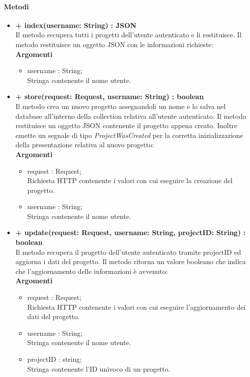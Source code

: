 	\paragraph{Metodi}
		\begin{itemize}
			\item \textbf{+ index(username: String) : JSON}\\
			Il metodo recupera tutti i progetti dell'utente autenticato e li restituisce. Il metodo restituisce un oggetto \gls{JSON} con le informazioni richieste:\\
			\textbf{Argomenti}
			\begin{itemize}
				\item username : String;\\
				Stringa contenente il nome utente.
			\end{itemize}
			
			\item \textbf{+ store(request: Request, username: String) : boolean}\\
			Il metodo crea un nuovo progetto assegnandoli un nome e lo salva nel \gls{database} all'interno della collection relativa all'utente autenticato. Il metodo restituisce un oggetto \gls{JSON} contenente il progetto appena creato. Inoltre emette un segnale di tipo \textit{ProjectWasCreated} per la corretta inizializzazione della presentazione relativa al nuovo progetto:\\
			\textbf{Argomenti}
			\begin{itemize}
				\item request : Request;\\
			 	Richiesta HTTP contenente i valori con cui eseguire la creazione del progetto.
			 	\item username : String;\\
			 	Stringa contenente il nome utente.
			\end{itemize}
			
			\item \textbf{+ update(request: Request, username: String, projectID: String) : boolean}\\
			Il metodo recupera il progetto dell'utente autenticato tramite projectID ed aggiorna i dati del progetto. Il metodo ritorna un valore booleano che indica che l'aggiornamento delle informazioni è avvenuto:\\
			\textbf{Argomenti}
			\begin{itemize}
				\item request : Request;\\
				Richiesta HTTP contenente i valori con cui eseguire l'aggiornamento dei dati del progetto.
				\item username : String;\\
				Stringa contenente il nome utente.
				\item projectID : string; \\
				Stringa contenente l'ID univoco di un progetto.
			\end{itemize}
			

\end{itemize}
